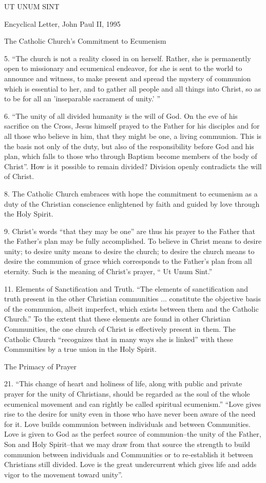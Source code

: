 \documentclass[oneside]{book}
\begin{document}
UT UNUM SINT

Encyclical Letter, John Paul II, 1995

The Catholic Church's Commitment to Ecumenism 

5. ``The church is not a reality closed in on herself. Rather, she is
permanently open to missionary and ecumenical endeavor, for she is sent to the
world to announce and witness, to make present and spread the mystery of
communion which is essential to her, and to gather all people and all things
into Christ, so as to be for all an 'inseparable sacrament of unity.' ''

6. ``The unity of all divided humanity is the will of God. On the eve of his
sacrifice on the Cross, Jesus himself prayed to the Father for his disciples and
for all those who believe in him, that they might be one, a living
communion. This is the basis not only of the duty, but also of the
responsibility before God and his plan, which falls to those who through Baptism
become members of the body of Christ''. How is it possible to remain divided?
Division openly contradicts the will of Christ.

8. The Catholic Church embraces with hope the commitment to ecumenism as a duty
of the Christian conscience enlightened by faith and guided by love through the
Holy Spirit.

9. Christ's words ``that they may be one'' are thus his prayer to the Father
that the Father's plan may be fully accomplished. To believe in Christ means to
desire unity; to desire unity means to desire the church; to desire the church
means to desire the communion of grace which corresponds to the Father's plan
from all eternity. Such is the meaning of Christ's prayer, `` Ut Unum Sint.''

11. Elements of Sanctification and Truth. ``The elements of sanctification and
truth present in the other Christian communities ... constitute the objective
basis of the communion, albeit imperfect, which exists between them and the
Catholic Church.'' To the extent that these elements are found in other
Christian Communities, the one church of Christ is effectively present in
them. The Catholic Church ``recognizes that in many ways she is linked'' with
these Communities by a true union in the Holy Spirit.

The Primacy of Prayer

21. ``This change of heart and holiness of life, along with public and private
prayer for the unity of Christians, should be regarded as the soul of the whole
ecumenical movement and can rightly be called spiritual ecumenism.'' ``Love
gives rise to the desire for unity even in those who have never been aware of
the need for it. Love builds communion between individuals and between
Communities. Love is given to God as the perfect source of communion--the unity
of the Father, Son and Holy Spirit--that we may draw from that source the
strength to build communion between individuals and Communities or to
re-establish it between Christians still divided. Love is the great undercurrent
which gives life and adds vigor to the movement toward unity''.
\end{document}
